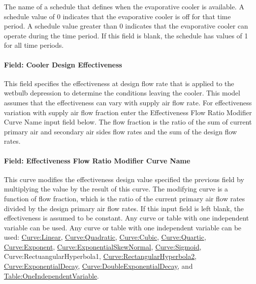 The name of a schedule that defines when the evaporative cooler is available. A schedule value of 0 indicates that the evaporative cooler is off for that time period. A schedule value greater than 0 indicates that the evaporative cooler can operate during the time period. If this field is blank, the schedule has values of 1 for all time periods.

\paragraph{Field: Cooler Design Effectiveness}\label{field-cooler-design-effectiveness}

This field specifies the effectiveness at design flow rate that is applied to the wetbulb depression to determine the conditions leaving the cooler. This model assumes that the effectiveness can vary with supply air flow rate. For effectiveness variation with supply air flow fraction enter the Effectiveness Flow Ratio Modifier Curve Name input field below. The flow fraction is the ratio of the sum of current primary air and secondary air sides flow rates and the sum of the design flow rates.

\paragraph{Field: Effectiveness Flow Ratio Modifier Curve Name}\label{field-effectiveness-flow-ratio-modifier-curve-name}

This curve modifies the effectiveness design value specified the previous field by multiplying the value by the result of this curve. The modifying curve is a function of flow fraction, which is the ratio of the current primary air flow rates divided by the design primary air flow rates. If this input field is left blank, the effectiveness is assumed to be constant. Any curve or table with one independent variable can be used. Any curve or table with one independent variable can be used: \hyperref[curvelinear]{Curve:Linear}, \hyperref[curvequadratic]{Curve:Quadratic}, \hyperref[curvecubic]{Curve:Cubic}, \hyperref[curvequartic]{Curve:Quartic}, \hyperref[curveexponent]{Curve:Exponent}, \hyperref[curveexponentialskewnormal]{\hyperref[curveexponent]{Curve:Exponent}ialSkewNormal}, \hyperref[curvesigmoid]{Curve:Sigmoid}, Curve:RectuangularHyperbola1, \hyperref[curverectangularhyperbola2]{Curve:RectangularHyperbola2}, \hyperref[curveexponentialdecay]{\hyperref[curveexponent]{Curve:Exponent}ialDecay}, \hyperref[curvedoubleexponentialdecay]{Curve:DoubleExponentialDecay}, and \hyperref[tableoneindependentvariable]{Table:OneIndependentVariable}.

